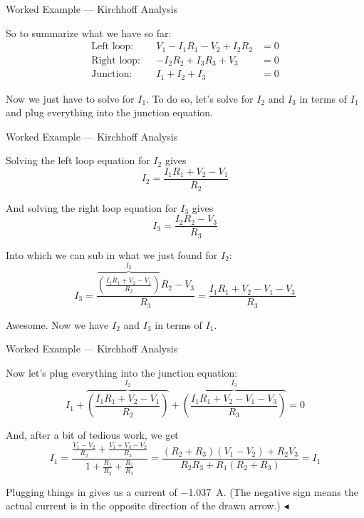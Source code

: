 \documentclass{beamer}
\begin{document}
\begin{frame}{Worked Example --- Kirchhoff Analysis}

So to summarize what we have so far:
\begin{align*}
    \text{Left loop:}&& V_1 - I_1 R_1 - V_2 + I_2 R_2 &= 0 \\
    \text{Right loop:}&& -I_2 R_2 + I_3 R_3 + V_3 &= 0 \\
    \text{Junction:}&& I_1 + I_2 + I_3 &= 0
\end{align*}

\vfill

Now we just have to solve for $I_1$. To do so, let's solve for $I_2$ and $I_3$ in terms of $I_1$ and plug everything into the junction equation.

\end{frame}

\begin{frame}{Worked Example --- Kirchhoff Analysis}

Solving the left loop equation for $I_2$ gives
\begin{equation*}
    I_2 = \frac{I_1 R_1 + V_2 - V_1}{R_2}
\end{equation*}

And solving the right loop equation for $I_3$ gives
\begin{equation*}
    I_3 = \frac{I_2 R_2 - V_3}{R_3}
\end{equation*}

Into which we can sub in what we just found for $I_2$:
\begin{equation*}
    I_3 = \frac{\overbrace{\left( \frac{I_1 R_1 + V_2 - V_1}{R_2} \right)}^{I_2} R_2 - V_3}{R_3} = \frac{I_1 R_1 + V_2 - V_1 - V_3}{R_3}
\end{equation*}

Awesome. Now we have $I_2$ and $I_3$ in terms of $I_1$.

\end{frame}

\begin{frame}{Worked Example --- Kirchhoff Analysis}

Now let's plug everything into the junction equation:
\begin{equation*}
    I_1 + \overbrace{\left( \frac{I_1 R_1 + V_2 - V_1}{R_2} \right)}^{I_2} + \overbrace{\left( \frac{I_1 R_1 + V_2 - V_1 - V_3}{R_3} \right)}^{I_3} = 0
\end{equation*}

And, after a bit of tedious work, we get
\begin{equation*}
    I_1 = \frac{\frac{V_1 - V_2}{R_2} + \frac{V_1 + V_3 - V_2}{R_3}}{1 + \frac{R_1}{R_2} + \frac{R_1}{R_3}} = \boxed{\frac{\left( R_2 + R_3 \right) \left( V_1 - V_2 \right) + R_2 V_3}{R_2 R_3 + R_1 \left( R_2 + R_3 \right)} = I_1}
\end{equation*}

Plugging things in gives us a current of \SI{-1.037}{\ampere}. (The negative sign means the actual current is in the opposite direction of the drawn arrow.) $\blacktriangleleft$

\end{frame}
\end{document}
